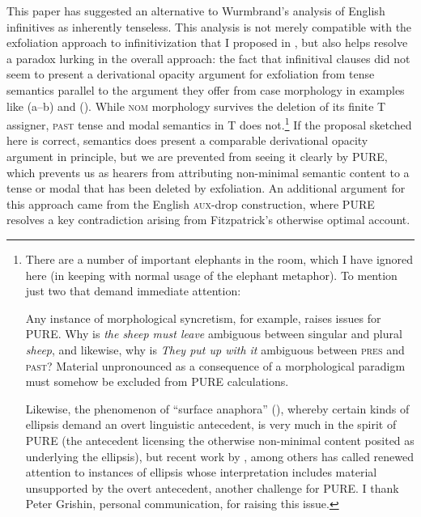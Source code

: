 \documentclass[output=paper]{langscibook}
\begin{document}
This paper has suggested an alternative to Wurmbrand's \citeyearpar{Wurmbrand:2014aa} analysis of English infinitives as inherently tenseless. This analysis is not merely compatible with the exfoliation approach to infinitivization that I proposed in \citet{Pesetsky:2019aa}, but also helps resolve a paradox lurking in the overall approach: the fact that infinitival clauses did not seem to present a derivational opacity argument for exfoliation from tense semantics parallel to the argument they offer from case morphology in examples like (a--b) and (). While \textsc{nom} morphology survives the deletion of its finite T assigner, \textsc{past} tense and modal semantics in T does not.\footnote{There are a number of important elephants in the room, which I have ignored here (in keeping with normal usage of the elephant metaphor). To mention just two that demand immediate attention: 

Any instance of morphological syncretism, for example, raises issues for PURE.  Why is \textit{the sheep must leave} ambiguous between singular and plural \textit{sheep}, and likewise, why is \textit{They put up with it} ambiguous between \textsc{pres} and \textsc{past}? Material unpronounced as a consequence of a morphological paradigm must somehow be excluded from PURE calculations. 


Likewise, the phenomenon of ``surface anaphora'' (\citealt{Hankamer1976a}), whereby certain kinds of ellipsis demand an overt linguistic antecedent, is very much in the spirit of PURE (the antecedent licensing the otherwise non-minimal content posited as underlying the ellipsis), but recent work by \citet{Rudin:2019aa}, among others has called renewed attention to instances of ellipsis whose interpretation includes material unsupported by the overt antecedent, another challenge for PURE. I thank Peter Grishin, personal communication, for raising this issue.} 
If the proposal sketched here is correct, semantics does present a comparable derivational opacity argument in principle, but we are prevented from seeing it clearly by PURE, which prevents us as hearers from attributing non-minimal semantic content to a tense or modal that has been deleted by exfoliation. An additional argument for this approach came from the English \textsc{aux}-drop construction, where PURE resolves a key contradiction arising from Fitzpatrick's otherwise optimal account.
\end{document}
